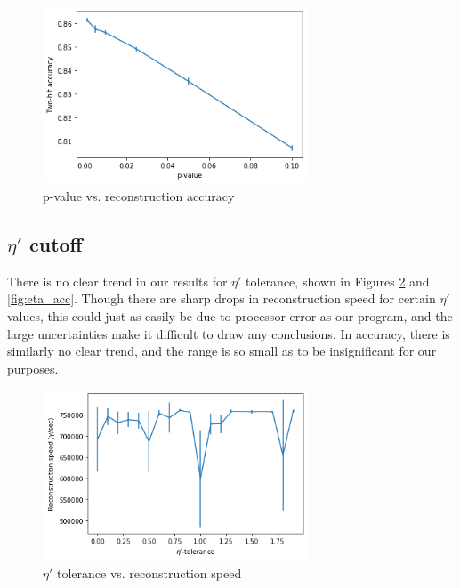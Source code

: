 \begin{figure}
    \centering
    \includegraphics[width=0.7\textwidth]{graphs/pi_p_acc.png}
    \caption{p-value vs. reconstruction accuracy}
    \label{fig:p_acc}
\end{figure}

\subsection{$\eta'$ cutoff}
There is no clear trend in our results for $\eta'$ tolerance, shown in Figures \ref{fig:eta_speed} and \ref{fig:eta_acc}. Though there are sharp drops in reconstruction speed for certain $\eta'$ values, this could just as easily be due to processor error as our program, and the large uncertainties make it difficult to draw any conclusions. In accuracy, there is similarly no clear trend, and the range is so small as to be insignificant for our purposes.

\begin{figure}
    \centering
    \includegraphics[width=0.7\textwidth]{graphs/pi_eta_speed.png}
    \caption{$\eta'$ tolerance vs. reconstruction speed}
    \label{fig:eta_speed}
\end{figure}

